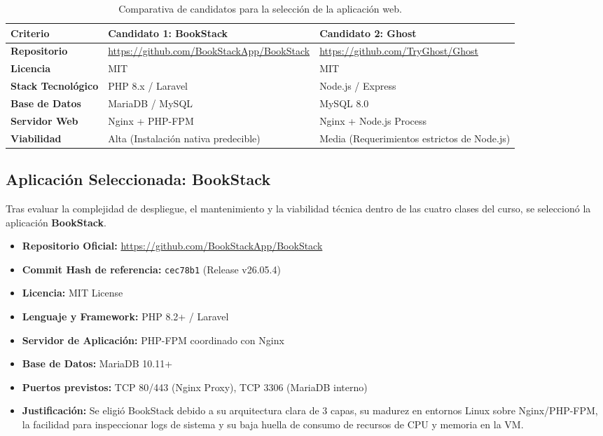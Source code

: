 \documentclass[12pt,a4paper]{article}
\begin{document}
\begin{table}[h!]
\centering
\small
\begin{tabular}{|p{3cm}|p{5.5cm}|p{5.5cm}|}
\hline
\textbf{Criterio} & \textbf{Candidato 1: BookStack} & \textbf{Candidato 2: Ghost} \\ \hline
\textbf{Repositorio} & \url{https://github.com/BookStackApp/BookStack} & \url{https://github.com/TryGhost/Ghost} \\ \hline
\textbf{Licencia} & MIT & MIT \\ \hline
\textbf{Stack Tecnológico} & PHP 8.x / Laravel & Node.js / Express \\ \hline
\textbf{Base de Datos} & MariaDB / MySQL & MySQL 8.0 \\ \hline
\textbf{Servidor Web} & Nginx + PHP-FPM & Nginx + Node.js Process \\ \hline
\textbf{Viabilidad} & Alta (Instalación nativa predecible) & Media (Requerimientos estrictos de Node.js) \\ \hline
\end{tabular}
\caption{Comparativa de candidatos para la selección de la aplicación web.}
\label{tab:candidatos}
\end{table}

\subsection{Aplicación Seleccionada: BookStack}
Tras evaluar la complejidad de despliegue, el mantenimiento y la viabilidad técnica dentro de las cuatro clases del curso, se seleccionó la aplicación \textbf{BookStack}.

\begin{itemize}
    \item \textbf{Repositorio Oficial:} \url{https://github.com/BookStackApp/BookStack}
    \item \textbf{Commit Hash de referencia:} \texttt{cec78b1} (Release v26.05.4)
    \item \textbf{Licencia:} MIT License
    \item \textbf{Lenguaje y Framework:} PHP 8.2+ / Laravel
    \item \textbf{Servidor de Aplicación:} PHP-FPM coordinado con Nginx
    \item \textbf{Base de Datos:} MariaDB 10.11+
    \item \textbf{Puertos previstos:} TCP 80/443 (Nginx Proxy), TCP 3306 (MariaDB interno)
    \item \textbf{Justificación:} Se eligió BookStack debido a su arquitectura clara de 3 capas, su madurez en entornos Linux sobre Nginx/PHP-FPM, la facilidad para inspeccionar logs de sistema y su baja huella de consumo de recursos de CPU y memoria en la VM.
\end{itemize}
\end{document}
